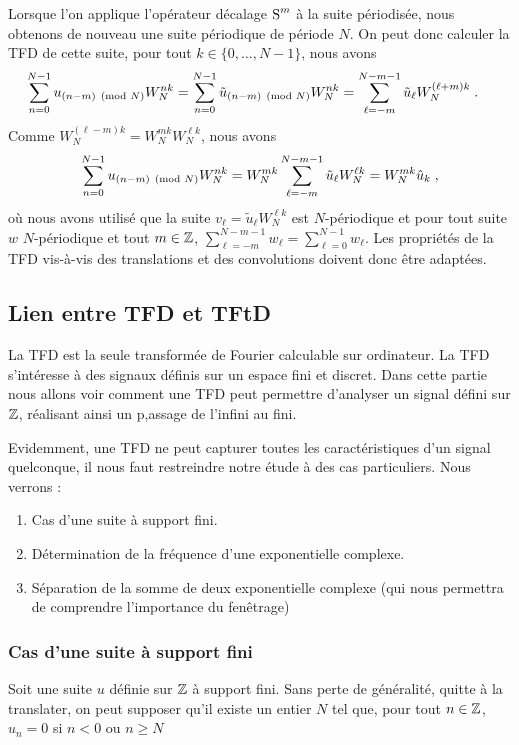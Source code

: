 Lorsque l'on applique l'op\'erateur décalage $\operatorname{S}^m$ à la suite p\'eriodis\'ee, nous obtenons de nouveau une suite p\'eriodique de p\'eriode $N$.
On peut donc calculer la TFD de cette suite, pour tout $k \in \{0,\dots,N-1\}$, nous avons
\begin{align*}
\sum_{n=0}^{N-1} u_{ (n-m) \pmod{N}} W_N^{nk} &= \sum_{n=0}^{N-1} \tilde{u}_{(n-m) \pmod{N}} W_N^{nk}= \sum_{\ell=-m}^{N-m-1} \tilde{u}_{\ell} W_N^{(\ell + m)k} \;.
\end{align*}
Comme  $W_N^{(\ell -m)k}= W_N^{mk} W_N^{\ell k}$, nous avons
\[
\sum_{n=0}^{N-1} u_{ (n-m) \pmod{N}} W_N^{nk} = W_N^{mk} \sum_{\ell=-m}^{N-m-1} \tilde{u}_{\ell} W_N^{\ell k}= W_N^{mk} \hat{u}_k \;,
\]
où nous avons utilis\'e que la suite $v_\ell= \tilde{u}_{\ell} W_N^{\ell k}$ est $N$-p\'eriodique et pour tout suite $w$ $N$-p\'eriodique et tout $m \in \mathbb{Z}$, $\sum_{\ell=-m}^{N-m-1} w_{\ell}= \sum_{\ell=0}^{N-1} w_\ell$. Les propriétés de la TFD vis-à-vis des translations et des convolutions doivent donc être adaptées.



\subsection{Lien entre TFD et TFtD}
La TFD est la seule transform\'{e}e de Fourier calculable sur ordinateur.  La TFD s'int\'{e}resse \`{a} des signaux d\'{e}finis sur un espace fini et discret.  Dans cette partie nous allons voir comment une TFD peut permettre d'analyser un signal d\'{e}fini sur $\mathbb{Z}$, r\'{e}alisant ainsi un p,assage de l'infini au fini.

Evidemment, une TFD ne peut capturer toutes les caract\'{e}ristiques d'un signal quelconque, il nous faut restreindre notre \'{e}tude \`{a} des cas particuliers. Nous verrons :
\begin{enumerate}
\item Cas d'une suite \`{a} support fini.
\item D\'{e}termination de la fr\'{e}quence d'une exponentielle complexe.
\item S\'{e}paration de la somme de deux exponentielle complexe (qui nous permettra de comprendre l'importance du fenêtrage)
\end{enumerate}

\subsubsection{Cas d'une suite \`{a} support fini}
Soit une suite $u$ d\'{e}finie sur $\mathbb{Z}$ \`{a} support fini. Sans perte de g\'{e}n\'{e}ralit\'{e}, quitte \`{a} la translater, on peut supposer qu'il existe un entier $N$ tel que, pour tout  $n\in \mathbb{Z}$, $u_{n}=0$ si $n<0$ ou $n\geq N$

